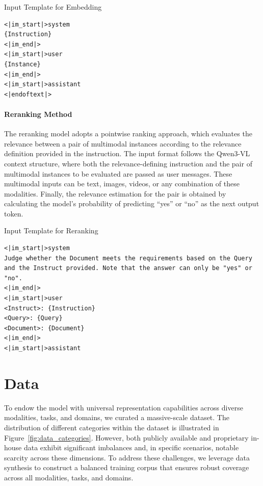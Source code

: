 \documentclass{article} %
\begin{document}
\begin{promptblock}{Input Template for Embedding}
\begin{verbatim}
<|im_start|>system
{Instruction}
<|im_end|>
<|im_start|>user
{Instance}
<|im_end|>
<|im_start|>assistant
<|endoftext|>
\end{verbatim}
\end{promptblock}

\paragraph{Reranking Method} The reranking model adopts a pointwise ranking approach, which evaluates the relevance between a pair of multimodal instances according to the relevance definition provided in the instruction. The input format follows the Qwen3-VL context structure, where both the relevance-defining instruction and the pair of multimodal instances to be evaluated are passed as user messages. These multimodal inputs can be text, images, videos, or any combination of these modalities. Finally, the relevance estimation for the pair is obtained by calculating the model's probability of predicting ``yes'' or ``no'' as the next output token.

\begin{promptblock}{Input Template for Reranking}
\begin{verbatim}
<|im_start|>system
Judge whether the Document meets the requirements based on the Query and the Instruct provided. Note that the answer can only be "yes" or "no".
<|im_end|>
<|im_start|>user
<Instruct>: {Instruction} 
<Query>: {Query} 
<Document>: {Document}
<|im_end|>
<|im_start|>assistant
\end{verbatim}
\end{promptblock}

\section{Data}

To endow the model with universal representation capabilities across diverse modalities, tasks, and domains, we curated a massive-scale dataset. The distribution of different categories within the dataset is illustrated in Figure~\ref{fig:data_categories}.
However, both publicly available and proprietary in-house data exhibit significant imbalances and, in specific scenarios, notable scarcity across these dimensions. To address these challenges, we leverage data synthesis to construct a balanced training corpus that ensures robust coverage across all modalities, tasks, and domains.
\end{document}
